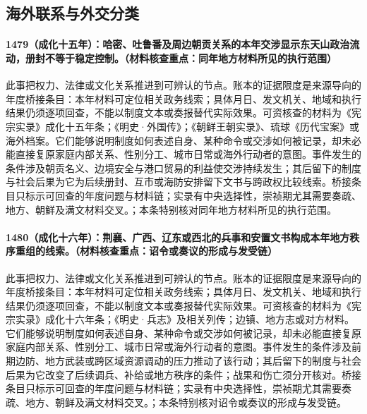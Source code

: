 \subsection{海外联系与外交分类}

\paragraph{1479（成化十五年）：哈密、吐鲁番及周边朝贡关系的本年交涉显示东天山政治流动，册封不等于稳定控制。（材料核查重点：同年地方材料所见的执行范围）} 此事把权力、法律或文化关系推进到可辨认的节点。账本的证据限度是来源导向的年度桥接条目：本年材料可定位相关政务线索；具体月日、发文机关、地域和执行结果仍须逐项回查，不能以制度文本或奏报替代实际效果。可资核查的材料为《宪宗实录》成化十五年条；《明史·外国传》；《朝鲜王朝实录》、琉球《历代宝案》或海外档案。它们能够说明制度如何表述自身、某种命令或交涉如何被记录，却未必能直接复原家庭内部关系、性别分工、城市日常或海外行动者的意图。事件发生的条件涉及朝贡名义、边境安全与港口贸易的利益使交涉持续发生；其后留下的制度与社会后果为它为后续册封、互市或海防安排留下文书与跨政权比较线索。桥接条目只标示可回查的年度问题与材料链；实录有中央选择性，崇祯期尤其需要奏疏、地方、朝鲜及满文材料交叉。；本条特别核对同年地方材料所见的执行范围。

\paragraph{1480（成化十六年）：荆襄、广西、辽东或西北的兵事和安置文书构成本年地方秩序重组的线索。（材料核查重点：诏令或奏议的形成与发受链）} 此事把权力、法律或文化关系推进到可辨认的节点。账本的证据限度是来源导向的年度桥接条目：本年材料可定位相关政务线索；具体月日、发文机关、地域和执行结果仍须逐项回查，不能以制度文本或奏报替代实际效果。可资核查的材料为《宪宗实录》成化十六年条；《明史·兵志》及相关列传；边镇、地方志或对方材料。它们能够说明制度如何表述自身、某种命令或交涉如何被记录，却未必能直接复原家庭内部关系、性别分工、城市日常或海外行动者的意图。事件发生的条件涉及前期边防、地方武装或跨区域资源调动的压力推动了该行动；其后留下的制度与社会后果为它改变了后续调兵、补给或地方秩序的条件；战果和伤亡须分开核对。桥接条目只标示可回查的年度问题与材料链；实录有中央选择性，崇祯期尤其需要奏疏、地方、朝鲜及满文材料交叉。；本条特别核对诏令或奏议的形成与发受链。

